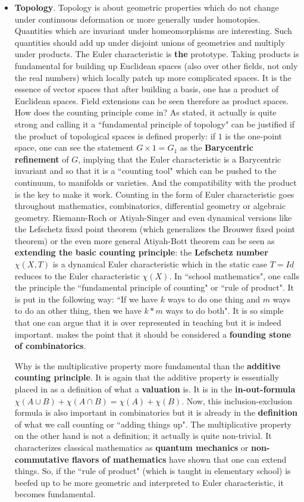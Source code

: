 \documentclass[12pt]{amsart}
\begin{document}
\begin{itemize}
\item {\bf Topology}. Topology is about geometric properties which do not change under 
continuous deformation or more generally under homotopies.
Quantities which are invariant under homeomorphisms are interesting. 
Such quantities should add up under disjoint unions of 
geometries and multiply under products. The Euler characteristic is {\bf the} prototype.
Taking products is fundamental for building up Euclidean spaces
(also over other fields, not only the real numbers) which locally patch up more complicated spaces. 
It is the essence of vector spaces that after building a basis, one has a product of Euclidean spaces.
Field extensions can be seen therefore as product spaces. 
How does the counting principle come in? As stated, it actually is quite strong and calling it a
``fundamental principle of topology" can be justified if the product of topological spaces is defined
properly: if $1$ is the one-point space, one can see the statement $G \times 1 = G_1$ 
as the {\bf Barycentric refinement} of $G$, implying that the Euler characteristic is a 
Barycentric invariant and so that it is a ``counting tool" which can be pushed to the continuum,
to manifolds or varieties. And the compatibility with the product is the key to make it work. 
Counting in the form of Euler characteristic goes throughout mathematics, 
combinatorics, differential geometry or algebraic geometry. Riemann-Roch or Atiyah-Singer
and even dynamical versions like the Lefschetz fixed point theorem (which generalizes the Brouwer fixed 
point theorem) or the even more general Atiyah-Bott theorem can be seen as {\bf extending the basic counting principle}:
the {\bf Lefschetz number} $\chi(X,T)$ is a dynamical Euler characteristic which in the static case $T=Id$ 
reduces to the Euler characteristic $\chi(X)$. 
In ``school mathematics", one calls the principle the ``fundamental principle of counting"
or ``rule of product". It is put in the following way: ``If we have $k$ ways to do one thing  and $m$ ways to do an 
other thing, then we have $k*m$ ways to do both". It is so simple that one can argue that it is over represented
in teaching but it is indeed important.   \cite{BiggsRoots} makes the point that it should be considered a 
{\bf founding stone of combinatorics}.

Why is the multiplicative property more fundamental 
than the {\bf additive counting principle}. It is again that the additive property is essentially 
placed in as a definition of what a {\bf valuation} is. It is in the {\bf in-out-formula} 
$\chi(A \cup B) + \chi(A \cap B)=\chi(A)+\chi(B)$. Now, this inclusion-exclusion formula is also important in combinatorics
but it is already in the {\bf definition} of what we call counting or ``adding things up".
The multiplicative property on the other hand is not a definition; it actually
is quite non-trivial. It characterizes classical mathematics as {\bf quantum mechanics} or {\bf non-commutative 
flavors of mathematics} have shown that one can extend things.
So, if the ``rule of product" (which is taught in elementary school) is 
beefed up to be more geometric and interpreted to Euler characteristic, it becomes fundamental. 


\end{itemize}
\end{document}
